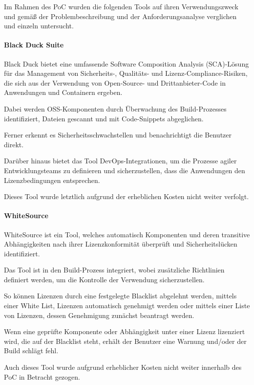 Im Rahmen des PoC wurden die folgenden Tools auf ihren Verwendungszweck und gemäß der Problembeschreibung und der Anforderungsanalyse verglichen und einzeln untersucht.

\paragraph{Black Duck Suite}

Black Duck bietet eine umfassende Software Composition Analysis (SCA)-Lösung für das Management von Sicherheits-, Qualitäts- und Lizenz-Compliance-Risiken, die sich aus der Verwendung von Open-Source- und Drittanbieter-Code in Anwendungen und Containern ergeben. \cite{synopsys_black_2021}

Dabei werden OSS-Komponenten durch Überwachung des Build-Prozesses identifiziert, Dateien gescannt und mit Code-Snippets abgeglichen. 

Ferner erkennt es Sicherheitsschwachstellen und benachrichtigt die Benutzer direkt. 

Darüber hinaus bietet das Tool DevOps-Integrationen, um die Prozesse agiler Entwicklungsteams zu definieren und sicherzustellen, dass die Anwendungen den Lizenzbedingungen entsprechen.

Dieses Tool wurde letztlich aufgrund der erheblichen Kosten nicht weiter verfolgt.

\paragraph{WhiteSource}

WhiteSource ist ein Tool, welches automatisch Komponenten und deren transitive Abhängigkeiten nach ihrer Lizenzkonformität überprüft und Sicherheitslücken identifiziert. \cite{whitesource_software_whitesource_2021}  

Das Tool ist in den Build-Prozess integriert, wobei zusätzliche Richtlinien definiert werden, um die Kontrolle der Verwendung sicherzustellen. 

So können Lizenzen durch eine festgelegte Blacklist abgelehnt werden, mittels einer White List, Lizenzen automatisch genehmigt werden oder mittels einer Liste von Lizenzen, dessen Genehmigung zunächst beantragt werden. 

Wenn eine geprüfte Komponente oder Abhängigkeit unter einer Lizenz lizenziert wird, die auf der Blacklist steht, erhält der Benutzer eine Warnung und/oder der Build schlägt fehl.

Auch dieses Tool wurde aufgrund erheblicher Kosten nicht weiter innerhalb des PoC in Betracht gezogen. 

